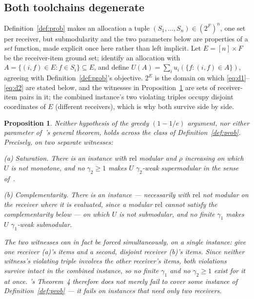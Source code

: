 \documentclass[sigconf,anonymous]{aamas}
\newtheorem{proposition}{Proposition}
\theoremstyle{remark}
\begin{document}
\subsection{Both toolchains degenerate}
\label{sec:degen}

Definition~\ref{def:prob} makes an allocation a tuple
$(S_1,\dots,S_n)\in(2^F)^n$, one set per receiver, but submodularity and
the two parameters below are properties of a \emph{set} function, made
explicit once here rather than left implicit. Let $E=[n]\times F$ be
the receiver-item ground set; identify an allocation with
$A=\{(i,f)\in E: f\in S_i\}\subseteq E$, and define
$U(A)=\sum_i u_i(\{f:(i,f)\in A\})$, agreeing with
Definition~\ref{def:prob}'s objective. $2^E$ is the domain on which
\eqref{eq:d1}--\eqref{eq:d2} are stated below, and the witnesses in
Proposition~\ref{prop:degen} are sets of receiver-item pairs in it; the
combined instance's two violating triples occupy disjoint coordinates
of $E$ (different receivers), which is why both survive side by side.

\begin{proposition}
\label{prop:degen}
Neither hypothesis of the greedy $(1-1/e)$ argument, nor either
parameter of~\cite{shilai2024}'s general theorem, holds across the
class of Definition~\ref{def:prob}. Precisely, on two separate
witnesses:

\emph{(a) Saturation.} There is an instance with $\mathrm{rel}$
modular and $\rho$ increasing on which $U$ is not monotone, and no
$\gamma_2 \ge 1$ makes $U$ $\gamma_2$-weak supermodular
in the sense of~\cite{shilai2024}.

\emph{(b) Complementarity.} There is an instance --- necessarily with
$\mathrm{rel}$ \emph{not} modular on the receiver where it is
evaluated, since a modular $\mathrm{rel}$ cannot satisfy the
complementarity below --- on which $U$ is not submodular, and no
finite $\gamma_1$ makes $U$ $\gamma_1$-weak submodular.

The two witnesses can in fact be forced simultaneously, on a single
instance: give one receiver (a)'s items and a second, disjoint
receiver (b)'s items. Since neither witness's violating triple
involves the other receiver's items, both violations survive intact
in the combined instance, so no finite $\gamma_1$ \emph{and} no
$\gamma_2\ge1$ exist for it at once. \cite{shilai2024}'s Theorem~4
therefore does not merely fail to cover some instance of
Definition~\ref{def:prob} --- it fails on instances that need only two
receivers.
\end{proposition}
\end{document}
